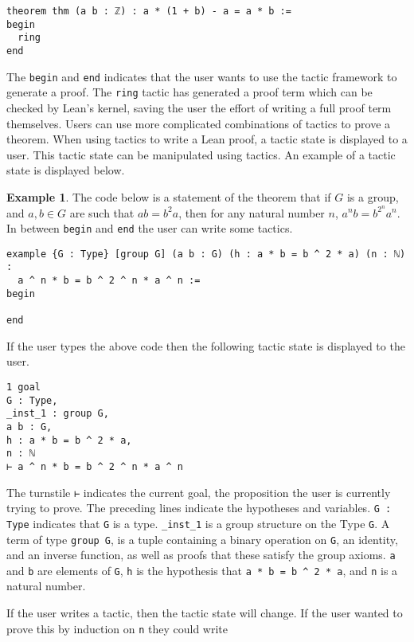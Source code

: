 \documentclass[12pt]{article} %
\theoremstyle{definition}
\theoremstyle{definition}
\theoremstyle{definition}
\theoremstyle{definition}
\newtheorem{exmpl}[thm]{Example}
\begin{document}
\begin{lstlisting}
theorem thm (a b : ℤ) : a * (1 + b) - a = a * b :=
begin
  ring
end
\end{lstlisting}

The \lstinline{begin} and \lstinline{end} indicates that the user wants to use the tactic
framework to generate a proof. The \lstinline{ring} tactic has generated a proof term
which can be checked by Lean's kernel, saving the user the effort of writing a full proof
term themselves.
 Users can use more complicated combinations of tactics
to prove a theorem. When using tactics to write a Lean proof, a tactic state is displayed to a user.
This tactic state can be manipulated using tactics. An example of a tactic state is displayed
below.

\begin{exmpl}

The code below is a statement of the theorem that if $G$ is a group, and
$a, b ∈ G$ are such that $ab = b^2a$, then for any natural number $n$,
$a^nb = b^{2^n}a^n$. In between \lstinline{begin} and \lstinline{end} the user
can write some tactics.

\begin{lstlisting}
example {G : Type} [group G] (a b : G) (h : a * b = b ^ 2 * a) (n : ℕ) :
  a ^ n * b = b ^ 2 ^ n * a ^ n :=
begin

end
\end{lstlisting}

If the user types the above code then the following tactic state is displayed to the user.

\begin{lstlisting}
1 goal
G : Type,
_inst_1 : group G,
a b : G,
h : a * b = b ^ 2 * a,
n : ℕ
⊢ a ^ n * b = b ^ 2 ^ n * a ^ n
\end{lstlisting}

The turnstile \lstinline{⊢} indicates the current goal, the proposition the user
is currently trying to prove. The preceding lines indicate the hypotheses and variables.
\lstinline{G : Type} indicates that \lstinline{G} is a type.
\lstinline{_inst_1} is a group structure on the Type \lstinline{G}.
A term of type \lstinline{group G}, is a tuple containing a binary operation on
\lstinline{G}, an identity, and an inverse function, as well as proofs that these
satisfy the group axioms. \lstinline{a} and \lstinline{b} are elements of
\lstinline{G}, \lstinline{h} is the hypothesis that \lstinline{a * b = b ^ 2 * a},
and \lstinline{n} is a natural number.

If the user writes a tactic, then the tactic state will change. If the user
wanted to prove this by induction on \lstinline{n} they could write


\end{exmpl}
\end{document}
